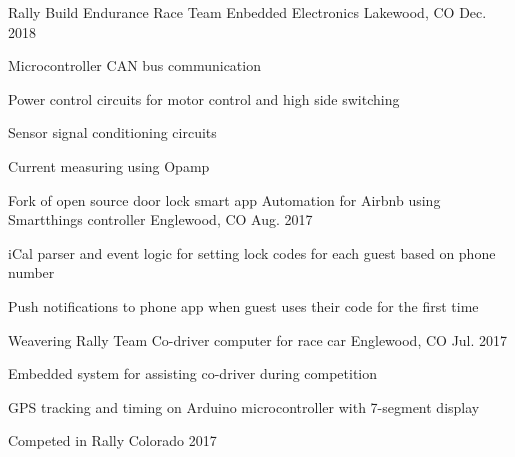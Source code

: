 

\begin{cventries}

  \cventry
    {Rally Build Endurance Race Team}
    {Enbedded Electronics}
    {Lakewood, CO} %
    {Dec. 2018} %
    {
      \begin{cvitems} %
        \item {Microcontroller CAN bus communication}
        \item {Power control circuits for motor control and high side switching}
        \item {Sensor signal conditioning circuits}
        \item {Current measuring using Opamp}
      \end{cvitems}
    }

  \cventry
    {Fork of open source door lock smart app}
    {Automation for Airbnb using Smartthings controller}
    {Englewood, CO} %
    {Aug. 2017} %
    {
      \begin{cvitems} %
        \item {iCal parser and event logic for setting lock codes for each guest based on phone number}
        \item {Push notifications to phone app when guest uses their code for the first time}
      \end{cvitems}
    }

  \cventry
    {Weavering Rally Team}
    {Co-driver computer for race car}
    {Englewood, CO} %
    {Jul. 2017} %
    {
      \begin{cvitems} %
        \item {Embedded system for assisting co-driver during competition}
        \item {GPS tracking and timing on Arduino microcontroller with 7-segment display}
        \item {Competed in Rally Colorado 2017}
      \end{cvitems}
    }


\end{cventries}
